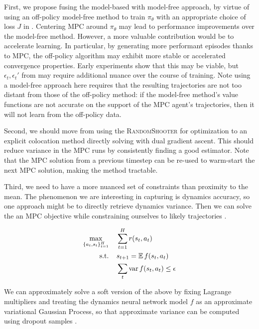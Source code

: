 \documentclass{article}
\begin{document}
First, we propose fusing the model-based with model-free approach, by virtue of using an off-policy model-free method to train $\pi_\theta$ with an appropriate choice of loss $J$ in . Centering MPC around $\pi_\theta$ may lead to performance improvements over the model-free method. However, a more valuable contribution would be to accelerate learning. In particular, by generating more performant episodes thanks to MPC, the off-policy algorithm may exhibit more stable or accelerated convergence properties. Early experiments show that this may be viable, but $\epsilon_t,\epsilon_t'$ from  may require additional nuance over the course of training. Note using a model-free approach here requires that the resulting trajectories are not too distant from those of the off-policy method: if the model-free method's value functions are not accurate on the support of the MPC agent's trajectories, then it will not learn from the off-policy data.

Second, we should move from using the \textsc{RandomShooter} for optimization to an explicit colocation method directly solving  with dual gradient ascent. This should reduce variance in the MPC runs by consistently finding a good estimator. Note that the MPC solution from a previous timestep can be re-used to warm-start the next MPC solution, making the method tractable.

Third, we need to have a more nuanced set of constraints than proximity to the mean. The phenomenon we are interesting in capturing is dynamics accuracy, so one approach might be to directly retrieve dynamics variance. Then we can solve the an MPC objective while constraining ourselves to likely trajectories .

\begin{align}
    \max_{\{a_t,s_t\}_{t=1}^H}&\;\;\;\; \sum_{t=1}^H r(s_t, a_t) \label{eq:likely}\\
    \text{s.t.} &\;\;\;\; s_{t+1} = \operatorname{\mathbb{E}} f(s_t,a_t)\nonumber\\
    & \;\;\;\;\sum_t\operatorname{var} f(s_t,a_t)\le \epsilon\nonumber
\end{align}

We can approximately solve a soft version of the above by fixing Lagrange multipliers and treating the dynamics neural network model $f$ as an approximate variational Gaussian Process, so that approximate variance can be computed using dropout samples \cite{gal2016dropout}.




\end{document}
